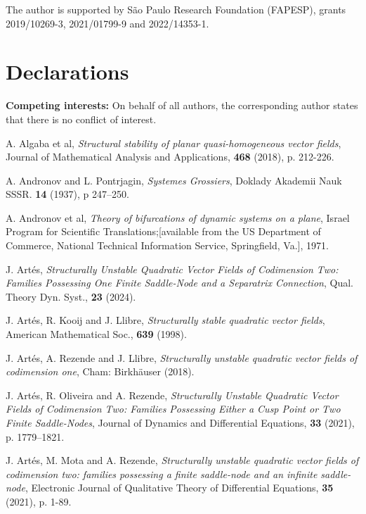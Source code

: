 \documentclass[11pt]{amsart}
\begin{document}
The author is supported by S\~ao Paulo Research Foundation (FAPESP), grants 2019/10269-3, 2021/01799-9 and 2022/14353-1.

\section*{Declarations}

\noindent\textbf{Competing interests:} On behalf of all authors, the corresponding author states that there is no conflict of interest.

\begin{thebibliography}{99}
	
{\sc A. Algaba et al}, 
{\it Structural stability of planar quasi-homogeneous vector fields},
Journal of Mathematical Analysis and Applications, \textbf{468} (2018), p. 212-226.
	
{\sc A. Andronov and L. Pontrjagin}, 
{\it Systemes Grossiers},
Doklady Akademii Nauk SSSR. \textbf{14} (1937), p 247–250.
	
{\sc A. Andronov et al}, 
{\it Theory of bifurcations of dynamic systems on a plane},
Israel Program for Scientific Translations;[available from the US Department of Commerce, National Technical Information Service, Springfield, Va.], 1971.

{\sc J. Artés}, 
{\it Structurally Unstable Quadratic Vector Fields of Codimension Two: Families Possessing One Finite Saddle-Node and a Separatrix Connection},
Qual. Theory Dyn. Syst., \textbf{23} (2024).

{\sc J. Artés, R. Kooij and J. Llibre}, 
{\it Structurally stable quadratic vector fields},
American Mathematical Soc., \textbf{639} (1998).

{\sc J. Artés, A. Rezende and J. Llibre}, 
{\it Structurally unstable quadratic vector fields of codimension one},
Cham: Birkhäuser (2018).

{\sc J. Artés, R. Oliveira and A. Rezende}, 
{\it Structurally Unstable Quadratic Vector Fields of Codimension Two: Families Possessing Either a Cusp Point or Two Finite Saddle-Nodes},
Journal of Dynamics and Differential Equations, \textbf{33} (2021), p. 1779–1821.

{\sc J. Artés, M. Mota and A. Rezende}, 
{\it Structurally unstable quadratic vector fields of codimension two: families possessing a finite	saddle-node and an infinite saddle-node},
Electronic Journal of Qualitative Theory of Differential Equations, \textbf{35} (2021), p. 1-89.	


\end{thebibliography}
\end{document}
